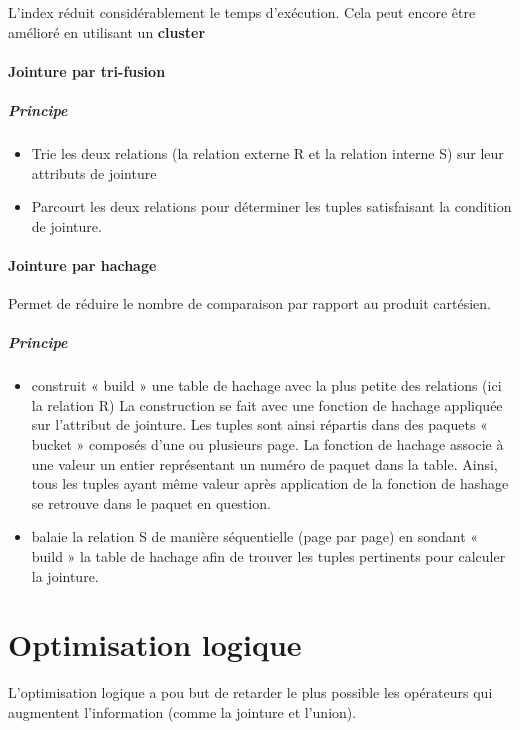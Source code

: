 \documentclass[12pt,a4paper,openany]{book}
\begin{document}
\begin{remarque}
	L'index réduit considérablement le temps d'exécution. Cela peut encore être amélioré en utilisant un \textbf{cluster}
\end{remarque}

\subsubsection{Jointure par tri-fusion}
\paragraph{Principe}
\begin{itemize}
	\item Trie les deux relations (la relation externe R et la relation interne S) sur leur attributs de 
		jointure 
	\item Parcourt les deux relations pour déterminer les tuples satisfaisant la condition de jointure.  
\end{itemize}

\subsubsection{Jointure par hachage}
Permet de réduire le nombre de comparaison par rapport au produit cartésien.  

\paragraph{Principe}
\begin{itemize}
	\item construit « build » une table de hachage avec la plus petite des relations (ici la relation R) 
		La construction se fait avec une fonction de hachage appliquée sur l'attribut de jointure. Les tuples 
		sont ainsi répartis dans des paquets « bucket » composés d'une ou plusieurs page.  
		La fonction de hachage associe à une valeur un entier représentant un numéro de paquet dans la 
		table. Ainsi, tous les tuples ayant même valeur après application de la fonction de hashage se 
		retrouve dans le paquet en question.  
	\item balaie la relation S de manière séquentielle (page par page) en sondant « build » la table 
		de hachage afin de trouver les tuples pertinents pour calculer la jointure. 
\end{itemize}

\chapter{Optimisation logique}
L'optimisation logique a pou but de retarder le plus possible les opérateurs qui augmentent l'information (comme la jointure et l'union).  
\end{document}
